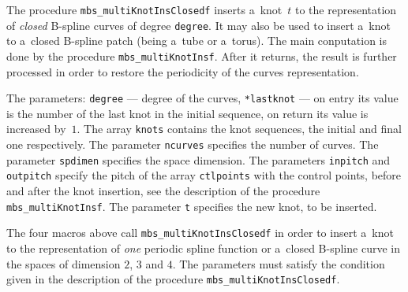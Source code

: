 \vspace{\bigskipamount}
The procedure \texttt{mbs\_multiKnotInsClosedf} inserts a~knot~$t$ to
the representation of \emph{closed} B-spline curves of degree
\texttt{degree}. It may also be used to insert a~knot to a~closed
B-spline patch (being a~tube or a~torus). The main conputation is done
by the procedure \texttt{mbs\_multiKnotInsf}. After it returns, the result
is further processed in order to restore the periodicity of the curves
representation.

The parameters: \texttt{degree} --- degree of the curves, \texttt{*lastknot}
--- on entry its value is the number of the last knot in the initial sequence,
on return its value is increased by~$1$. The array \texttt{knots} contains
the knot sequences, the initial and final one respectively. The parameter
\texttt{ncurves} specifies the number of curves. The parameter \texttt{spdimen}
specifies the space dimension. The parameters \texttt{inpitch} and \texttt{outpitch}
specify the pitch of the array \texttt{ctlpoints} with the control points,
before and after the knot insertion, see the description of the procedure
\texttt{mbs\_multiKnotInsf}.
The parameter \texttt{t} specifies the new knot, to be inserted.

\vspace{\bigskipamount}
The four macros above call \texttt{mbs\_multiKnotInsClosedf} in order to
insert a~knot to the representation of \emph{one} periodic spline function
or a~closed B-spline curve in the spaces of dimension $2$, $3$ and $4$.
The parameters must satisfy the condition given in the description
of the procedure \texttt{mbs\_multiKnotInsClosedf}.



